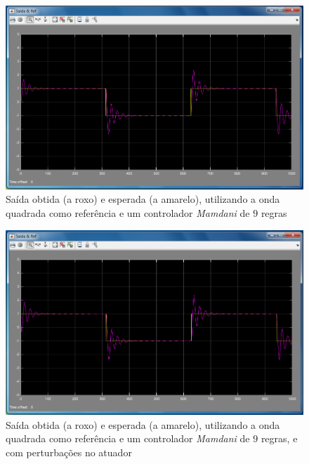 \documentclass{article}
\begin{document}

\begin{figure}[h]
  \centering
      \includegraphics[scale=0.3]{Images/Mamdani_9_square.png}
  \caption{Saída obtida (a roxo) e esperada (a amarelo), utilizando a onda quadrada como referência e um controlador \emph{Mamdani} de $9$ regras}
\end{figure}

\begin{figure}[h]
  \centering
      \includegraphics[scale=0.3]{Images/Mamdani_9_square_actuator.png}
  \caption{Saída obtida (a roxo) e esperada (a amarelo), utilizando a onda quadrada como referência e um controlador \emph{Mamdani} de $9$ regras, e com perturbações no atuador}
\end{figure}
\end{document}
